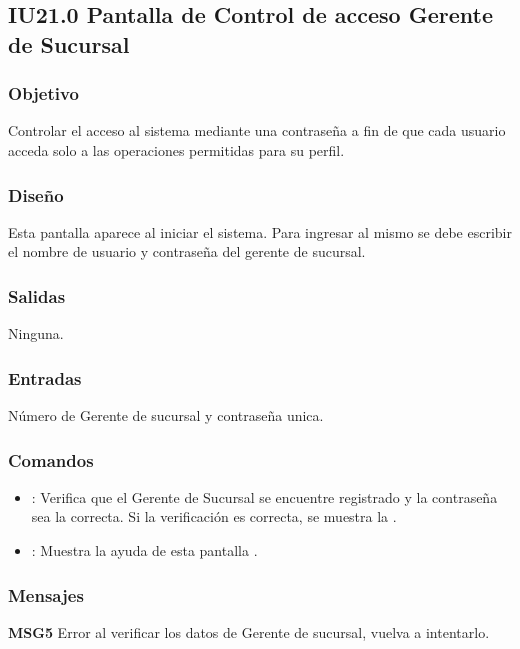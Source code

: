 \subsection{IU21.0 Pantalla de Control de acceso Gerente de Sucursal}


\subsubsection{Objetivo}
	Controlar el acceso al sistema mediante una contraseña a fin de que cada usuario acceda solo a las operaciones permitidas para su perfil.

\subsubsection{Diseño}
	Esta pantalla aparece al iniciar el sistema. Para ingresar al mismo se debe escribir el nombre de usuario y contraseña del gerente de sucursal. 


\subsubsection{Salidas}

	Ninguna.

\subsubsection{Entradas}
Número de Gerente de sucursal y contraseña unica.

\subsubsection{Comandos}
\begin{itemize}
	\item {}: Verifica que el Gerente de Sucursal se encuentre registrado y la contraseña sea la correcta. Si la verificación es correcta, se muestra la .
	\item {}: Muestra la ayuda de esta pantalla .
\end{itemize}

\subsubsection{Mensajes}
	\begin{Citemize}
		\item {\bf MSG5} Error al verificar los datos de Gerente de sucursal, vuelva a intentarlo.
	\end{Citemize}
